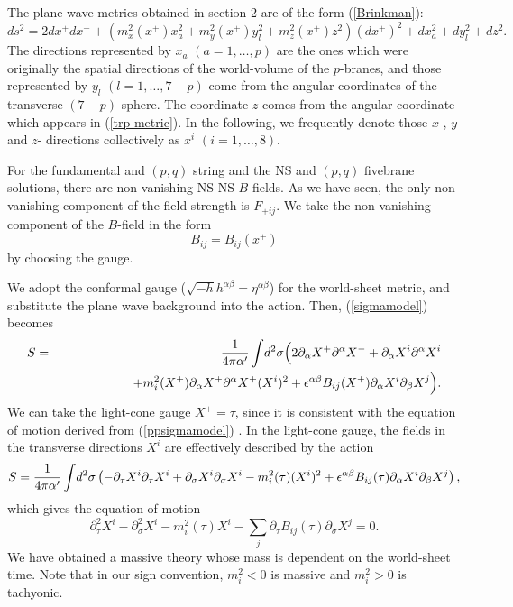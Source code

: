 \documentclass[a4paper,12pt]{article}
\begin{document}
The plane wave metrics obtained in section 2 are 
of the form (\ref{Brinkman}):
\[
ds^2=2dx^{+}dx^{-}+
\left(m^{2}_{x}(x^{+}) x_{a}^{2}+m_{y}^{2} (x^{+}) y_{l}^2
+m_{z}^2(x^{+})z^2\right)
(dx^{+})^2+ dx_{a}^{2}+ dy_{l}^{2}+ dz^2.
\]
The directions represented by $x_a$ $(a=1,\ldots, p)$
are the ones which were originally the spatial
directions of the world-volume of the $p$-branes,
and those represented by $y_l$ $(l=1,\ldots, 7-p)$ 
come from the angular coordinates of the transverse
$(7-p)$-sphere. The coordinate
$z$ comes from the angular coordinate which appears
in (\ref{trp metric}). In the following,
we frequently denote those $x$-, $y$- and $z$- directions
collectively as $x^i$ $(i=1,\ldots,8)$. 

For the fundamental and $(p,q)$ string and the 
NS and $(p,q)$ fivebrane solutions, 
there are non-vanishing NS-NS $B$-fields.
As we have seen, the only non-vanishing component of the
field strength is $F_{+ij}$. We take the non-vanishing 
component of the $B$-field in the form
\[
B_{ij}=B_{ij}(x^+)
\]
by choosing the gauge.

We adopt the conformal gauge ($\sqrt{-h}h^{\alpha\beta}=
\eta^{\alpha\beta}$) for the world-sheet
metric, and substitute the plane wave background 
into the action. Then, (\ref{sigmamodel}) becomes
\begin{eqnarray}
S&=&{1\over 4\pi \alpha'}\int\! d^2\sigma \Big(
2\partial_{\alpha} X^{+}\partial^{\alpha} X^{-} 
+ \partial_{\alpha} X^{i}\partial^{\alpha} X^{i}
\nonumber\\
&&\hspace*{2cm}
+m^{2}_{i}(X^{+})\partial_{\alpha} X^{+}\partial^{\alpha} 
X^{+} (X^{i})^2
+\epsilon^{\alpha\beta}B_{ij}(X^{+})\partial_{\alpha} 
X^{i}\partial_{\beta} X^{j}\Big).
\label{ppsigmamodel}
\end{eqnarray}
We can take the light-cone gauge $X^{+}=\tau$,
since it is consistent with the equation
of motion derived from (\ref{ppsigmamodel}) \cite{HoSte}.
In the light-cone gauge, the fields in the transverse
directions $X^{i}$ are effectively described by the action
\[
S={1\over 4\pi \alpha'}\int\! d^2\sigma \left(
-\partial_{\tau} X^{i}\partial_{\tau} X^{i} 
+\partial_{\sigma} X^{i}\partial_{\sigma} X^{i}
-m^{2}_{i}(\tau)(X^{i})^{2}
+\epsilon^{\alpha\beta}B_{ij}(\tau)
\partial_{\alpha} X^{i}\partial_{\beta} X^{j}
\right),
\]
which gives the equation of motion 
\begin{equation}
\partial^{2}_{\tau} X^{i} 
-\partial^{2}_{\sigma} X^{i} -m_{i}^{2}(\tau) X^{i} 
-\sum_{j}\partial_{\tau} B_{ij}(\tau)
\partial_{\sigma} X^{j}=0.
\label{ppeom}
\end{equation}
We have obtained a massive theory whose mass is dependent
on the world-sheet time. Note that in our sign convention,
$m^{2}_{i}<0$ is massive and $m^{2}_{i}>0$ is tachyonic.
\end{document}
